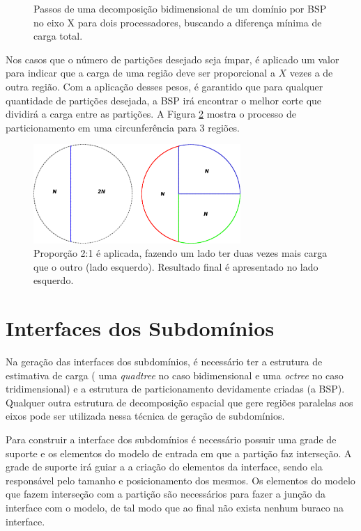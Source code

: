 \begin{figure}[ht]
{	}
	\caption{Passos de uma decomposição bidimensional de um domínio por BSP no eixo X para dois processadores, buscando a diferença mínima de carga total.}
	\label{fig:passos_decomposicao_BSP}
\end{figure}


Nos casos que o número de partições desejado seja ímpar, é aplicado um valor para indicar que a carga de uma região deve ser proporcional a $X$ vezes a de outra região. Com a aplicação desses pesos, é garantido que para qualquer quantidade de partições desejada, a BSP irá encontrar o melhor corte que dividirá a carga entre as partições. A Figura \ref{fig:circunferencia_cortejunto} mostra o processo de particionamento em uma circunferência para 3 regiões.

\begin{figure}[!ht]
	\centering
	\includegraphics[width=0.7\textwidth]{fig/circunferencia_cortejunto.png}
	\caption{Proporção 2:1 é aplicada, fazendo um lado ter duas vezes mais carga que o outro (lado esquerdo). Resultado final é apresentado no lado esquerdo.}
	\label{fig:circunferencia_cortejunto}
\end{figure}

\section{Interfaces dos Subdomínios}

Na geração das interfaces dos subdomínios, é necessário ter a estrutura de estimativa de carga ( uma \textit{quadtree} no caso bidimensional e uma \textit{octree} no caso tridimensional) e a estrutura de particionamento devidamente criadas (a BSP). Qualquer outra estrutura de decomposição espacial que gere regiões paralelas aos eixos pode ser utilizada nessa técnica de geração de subdomínios. 

Para construir a interface dos subdomínios é necessário possuir uma grade de suporte e os elementos do modelo de entrada em que a partição faz interseção. A grade de suporte irá guiar a a criação do elementos da interface, sendo ela responsável pelo tamanho e posicionamento dos mesmos. Os elementos do modelo que fazem interseção com a partição são necessários para fazer a junção da interface com o modelo, de tal modo que ao final não exista nenhum buraco na interface.

